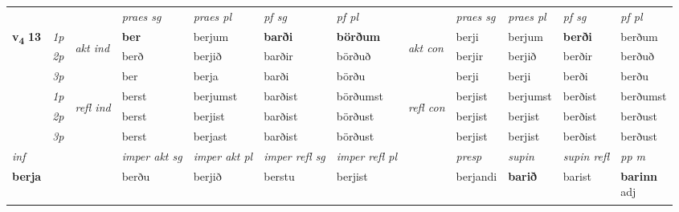 \begin{longtable}[l]{X>{\footnotesize\itshape}llXXXXlXXXX}
 & &   & \textit{praes sg}  & \textit{praes pl}    & \textit{ pf sg} & \textit{pf pl} & & \textit{praes sg}  & \textit{praes pl}    & \textit{pf sg} & \textit{pf pl }  \\ \cmidrule{4-7} \cmidrule{9-12}
 \multirow{2}{*}{{{\textbf{v{\textsubscript{4}}} \Large{\textbf{13}}}}}  & 1p & \multirow{3}{*}{\begin{turn}{90}\textit{akt ind}\end{turn}} & \textbf{ber} & berjum & \textbf{barði} & \textbf{börðum} & \multirow{3}{*}{\begin{turn}{90}\textit{akt con}\end{turn}} &berji & berjum & \textbf{berði} & berðum\\*
 & 2p &  &  berð  & berjið & barðir & börðuð & & berjir & berjið & berðir & berðuð \\*
 & 3p &  & ber & berja & barði & börðu & & berji & berji& berði & berðu \\*
\cmidrule{4-7} \cmidrule{9-12}
 & 1p & \multirow{3}{*}{\begin{turn}{90}\textit{refl ind}\end{turn}}  & berst & berjumst & barðist & börðumst & \multirow{3}{*}{\begin{turn}{90}\textit{refl con}\end{turn}}  &berjist & berjumst & berðist & berðumst \\*
 & 2p &  & berst & berjist & barðist & börðust & &berjist & berjist & berðist & berðust \\*
 & 3p  & & berst & berjast & barðist & börðust & & berjist & berjist& berðist & berðust \\*
\cmidrule{4-7} \cmidrule{9-12}

   {\textit{inf}} & &  & \textit{imper akt sg} & \textit{imper akt pl} & \textit{imper refl sg} & \textit{imper refl pl} && \textit{presp} & \textit{supin} & \textit{supin refl} & \textit{pp m} \\*
  {\textbf{berja}} & && berðu  & berjið & berstu & berjist && berjandi &  \textbf{barið} & barist & \specialcell{\textbf{barinn} \\ adj\textbf{\textsubscript{}}} \\*

\midrule


\end{longtable}
